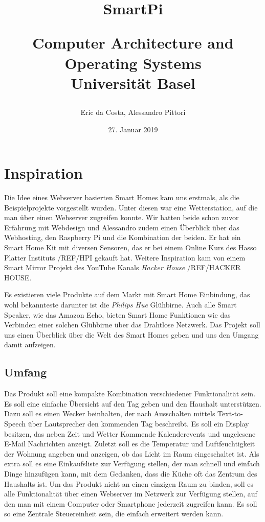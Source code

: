 \documentclass[11pt,a4paper]{article}
\title{SmartPi\\ \begin{large} Computer Architecture and Operating Systems\\ Universität Basel\end{large}}
\author{Eric da Costa, Alessandro Pittori}
\date{27. Januar 2019}
\begin{document}
\maketitle

\newpage

\section{Inspiration}
Die Idee eines Webserver basierten Smart Homes kam uns erstmals, als die Beispielprojekte vorgestellt wurden. Unter diesen war eine Wetterstation, auf die man über einen Webserver zugreifen konnte. Wir hatten beide schon zuvor Erfahrung mit Webdesign und Alessandro zudem einen Überblick über das Webhosting, den Raspberry Pi und die Kombination der beiden. Er hat ein Smart Home Kit mit diversen Sensoren, das er bei einem Online Kurs des Hasso Platter Instituts /REF/HPI gekauft hat. Weitere Inspiration kam von einem Smart Mirror Projekt des YouTube Kanals \textit{Hacker House} /REF/HACKER HOUSE.

Es existieren viele Produkte auf dem Markt mit Smart Home Einbindung, das wohl bekannteste darunter ist die \textit{Philips Hue} Glühbirne. Auch alle Smart Speaker, wie das Amazon Echo, bieten Smart Home Funktionen wie das Verbinden einer solchen Glühbirne über das Drahtlose Netzwerk. Das Projekt soll uns einen Überblick über die Welt des Smart Homes geben und uns den Umgang damit aufzeigen.

\subsection{Umfang}
Das Produkt soll eine kompakte Kombination verschiedener Funktionalität sein. Es soll eine einfache Übersicht auf den Tag geben und den Haushalt unterstützen.
Dazu soll es einen Wecker beinhalten, der nach Ausschalten mittels Text-to-Speech über Lautsprecher den kommenden Tag beschreibt. Es soll ein Display besitzen, das neben Zeit und Wetter Kommende Kalenderevents und ungelesene E-Mail Nachrichten anzeigt. Zuletzt soll es die Temperatur und Luftfeuchtigkeit der Wohnung angeben und anzeigen, ob das Licht im Raum eingeschaltet ist. Als extra soll es eine Einkaufsliste zur Verfügung stellen, der man schnell und einfach Dinge hinzufügen kann, mit dem Gedanken, dass die Küche oft das Zentrum des Haushalts ist. Um das Produkt nicht an einen einzigen Raum zu binden, soll es alle Funktionalität über einen Webserver im Netzwerk zur Verfügung stellen, auf den man mit einem Computer oder Smartphone jederzeit zugreifen kann. Es soll so eine Zentrale Steuereinheit sein, die einfach erweitert werden kann.
\end{document}
